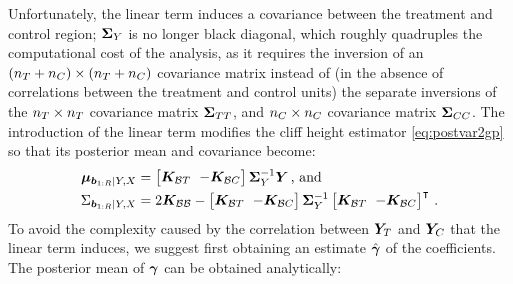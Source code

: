 Unfortunately, the linear term induces a covariance between the treatment and control region; \(\bm{\Sigma}_Y\) is no longer black diagonal, which roughly quadruples the computational cost of the analysis, as it requires the inversion of an \((n_T{}+n_C{}) \times (n_T{}+n_C{})\) covariance matrix instead of (in the absence of correlations between the treatment and control units) the separate inversions of the \(n_T{} \times n_T{}\) covariance matrix \(\bm{\Sigma}_{T T}\), and \(n_C{} \times n_C{}\) covariance matrix \(\bm{\Sigma}_{C C}\).
The introduction of the linear term modifies the cliff height estimator \autoref{eq:postvar2gp} so that its posterior mean and covariance become:
\begin{equation}
    \begin{split}
        \muvec_{\sentinels \mid Y, X} &=
        \begingroup\SmallColSep
        \begin{bmatrix}
            \KBT & -\KBC
        \end{bmatrix}
        \SigmaMat_Y^{-1}
        \Yvec
        \endgroup
        \,\text{, and}\\
        \Sigma_{\sentinels \mid Y, X} &=
        \begingroup\SmallColSep
        2 \KBB -
        \begin{bmatrix}
            \KBT & -\KBC
        \end{bmatrix}
        \SigmaMat_Y^{-1}
        \begin{bmatrix}
            \KBT & -\KBC
        \end{bmatrix}\trans
        \endgroup
        \,.
    \end{split}
    \label{eq:cliff_with_covariates}
\end{equation}
To avoid the complexity caused by the correlation between \(\bm{Y}_{T}\) and \(\bm{Y}_{C}\) that the linear term induces, we suggest first obtaining an estimate \(\hat{\bm{\gamma}}\) of the coefficients.
The posterior mean of \(\bm{\gamma}\) can be obtained analytically:

